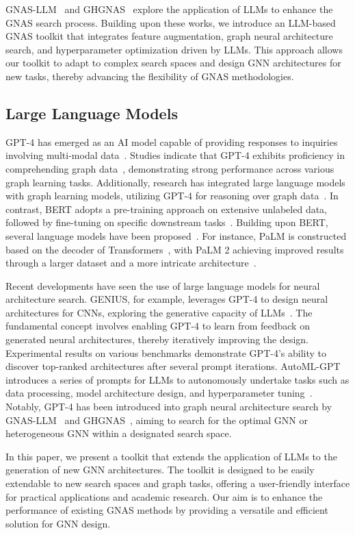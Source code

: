 GNAS-LLM~\cite{wang2023graph} and GHGNAS~\cite{dong2023heterogeneous} explore the application of LLMs to enhance the GNAS search process. Building upon these works, we introduce an LLM-based GNAS toolkit that integrates feature augmentation, graph neural architecture search, and hyperparameter optimization driven by LLMs. This approach allows our toolkit to adapt to complex search spaces and design GNN architectures for new tasks, thereby advancing the flexibility of GNAS methodologies.

\subsection{Large Language Models}

GPT-4 has emerged as an AI model capable of providing responses to inquiries involving multi-modal data~\cite{openai2023gpt4}. Studies indicate that GPT-4 exhibits proficiency in comprehending graph data~\cite{guo2023gpt4graph}, demonstrating strong performance across various graph learning tasks. Additionally, research has integrated large language models with graph learning models, utilizing GPT-4 for reasoning over graph data~\cite{zhanggraph}. In contrast, BERT adopts a pre-training approach on extensive unlabeled data, followed by fine-tuning on specific downstream tasks~\cite{DBLP:conf/naacl/DevlinCLT19}. Building upon BERT, several language models have been proposed~\cite{DBLP:journals/corr/abs-1907-11692,DBLP:conf/iclr/LanCGGSS20,DBLP:conf/iclr/HeLGC21}. For instance, PaLM is constructed based on the decoder of Transformers~\cite{Vaswani2017AttentionIA}, with PaLM 2 achieving improved results through a larger dataset and a more intricate architecture~\cite{chowdhery2022palm,anil2023palm}.

Recent developments have seen the use of large language models for neural architecture search. GENIUS, for example, leverages GPT-4 to design neural architectures for CNNs, exploring the generative capacity of LLMs~\cite{zheng2023can}. The fundamental concept involves enabling GPT-4 to learn from feedback on generated neural architectures, thereby iteratively improving the design. Experimental results on various benchmarks demonstrate GPT-4's ability to discover top-ranked architectures after several prompt iterations. AutoML-GPT introduces a series of prompts for LLMs to autonomously undertake tasks such as data processing, model architecture design, and hyperparameter tuning~\cite{zhang2023automl}. Notably, GPT-4 has been introduced into graph neural architecture search by GNAS-LLM~\cite{wang2023graph} and GHGNAS~\cite{dong2023heterogeneous}, aiming to search for the optimal GNN or heterogeneous GNN within a designated search space.

In this paper, we present a toolkit that extends the application of LLMs to the generation of new GNN architectures. The toolkit is designed to be easily extendable to new search spaces and graph tasks, offering a user-friendly interface for practical applications and academic research. Our aim is to enhance the performance of existing GNAS methods by providing a versatile and efficient solution for GNN design.